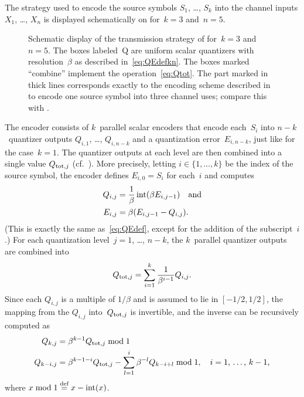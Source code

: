 The strategy used to encode the source symbols $S_1$, \dots, $S_k$ into the
channel inputs $X_1$, \dots, $X_n$ is displayed schematically on
 for~$k=3$ and~$n=5$. 
\begin{figure}
  \begin{center}
    
  \end{center}
  \caption{Schematic display of the transmission strategy of 
  for~$k = 3$ and~$n=5$. The boxes labeled~\textsf{Q} are uniform scalar
  quantizers with resolution~$\beta$ as described in~\eqref{eq:QEdefkn}. The
  boxes marked ``combine'' implement the operation~\eqref{eq:Qtot}. The
  part marked in thick lines corresponds exactly to the encoding scheme
  described in  to encode one source symbol into three
  channel uses; compare this with .}
  \label{fig:knencoding}
\end{figure}
The encoder consists of $k$~parallel scalar encoders that encode each~$S_i$ into
$n-k$~quantizer outputs $Q_{i,1}$, \dots, $Q_{i,n-k}$ and a quantization
error~$E_{i,n-k}$, just like for the case~$k=1$. The quantizer outputs at each
level are then combined into a single value $Q_{\operatorname{tot},j}$
(cf.~). More precisely, letting $i \in \{1, \dots, k\}$ be
the index of the source symbol, the encoder defines $E_{i,0} = S_i$ for
each~$i$ and computes
\begin{align}
  Q_{i,j} &= \frac{1}{\beta} \operatorname{int}(\beta E_{i,j-1}) \quad\text{and} \nonumber \\
  E_{i,j} &= \beta(E_{i,j-1} - Q_{i,j}). \label{eq:QEdefkn}
\end{align}
(This is exactly the same as~\eqref{eq:QEdef}, except for the addition of the
subscript~$i$.) For each quantization level~$j = 1$, \dots, $n-k$, the
$k$~parallel quantizer outputs are combined into
\begin{equation}
  \label{eq:Qtot}
  Q_{\operatorname{tot},j} = \sum_{i=1}^k \frac{1}{\beta^{i-1}} Q_{i,j}.
\end{equation}
Since each $Q_{i,j}$ is a multiple of $1/\beta$ and is assumed to lie in $[-1/2,
1/2]$, the mapping from the $Q_{i,j}$ into~$Q_{\operatorname{tot},j}$ is invertible, and the
inverse can be recursively computed as
\begin{align}
  Q_{k,j} &= \beta^{k-1} Q_{\operatorname{tot},j} \bmod 1 \nonumber \\
  Q_{k-i,j} &= \beta^{k-1-i} Q_{\operatorname{tot},j} - \sum_{l = 1}^i \beta^{-l} Q_{k - i +
  l} \bmod 1, \quad\text{$i = 1$, \dots, $k-1$,} 
  \label{eq:Qtotinv}
\end{align}
where $x \bmod 1 \stackrel{\text{def}}{=} x - \operatorname{int}(x)$.

